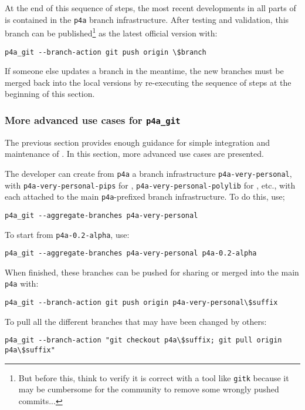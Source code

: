 \documentclass[a4paper]{article}
\begin{document}
At the end of this sequence of steps, the most recent developments in all
parts of \Apfa is contained in the \verb|p4a| branch infrastructure.
After testing and validation, this branch can be published\footnote{But
  before this, think to verify it is correct with a tool like
  \texttt{gitk} because it may be cumbersome for the community to remove
  some wrongly pushed commits...}  as the latest official version with:
\begin{verbatim}
p4a_git --branch-action git push origin \$branch
\end{verbatim}
If someone else updates a branch in the meantime, the new branches
must be merged back into the local versions by re-executing the sequence
of steps at the beginning of this section.

\subsubsection{More advanced use cases for \protect\texttt{p4a\_git}}
\label{sec:more-advanced-use}

The previous section provides enough guidance for simple integration
and maintenance of \Apfa. In this section, more advanced use cases are
presented.

The developer can create from \texttt{p4a} a branch infrastructure
\verb|p4a-very-personal|, with \verb|p4a-very-personal-pips| for
\Apips, \verb|p4a-very-personal-polylib| for \Apolylib, etc.,
with each attached to the main \verb|p4a|-prefixed branch
infrastructure. To do this, use;
\begin{verbatim}
p4a_git --aggregate-branches p4a-very-personal
\end{verbatim}

To start from \texttt{p4a-0.2-alpha}, use:
\begin{verbatim}
p4a_git --aggregate-branches p4a-very-personal p4a-0.2-alpha
\end{verbatim}

When finished, these branches can be pushed for sharing or merged
into the main \Apfa \texttt{p4a} with:
\begin{verbatim}
p4a_git --branch-action git push origin p4a-very-personal\$suffix
\end{verbatim}

To pull all the different \Apfa branches that may have been
changed by others:
\begin{verbatim}
p4a_git --branch-action "git checkout p4a\$suffix; git pull origin p4a\$suffix"
\end{verbatim}
\end{document}
